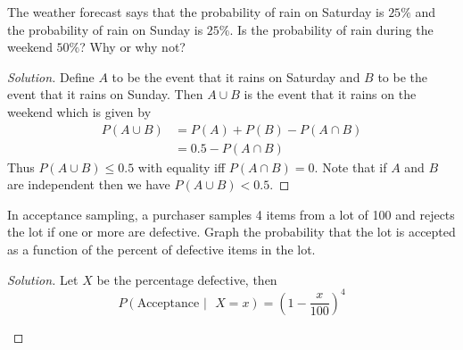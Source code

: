 \begin{exercise}{9} \label{1.9}
    The weather forecast says that the probability of rain on Saturday is \( 25\% \) and the probability of rain on Sunday is \( 25\% \). Is the probability of rain during the weekend \( 50\%\)? Why or why not?
    
    \begin{proof}[Solution]
        Define \( A \) to be the event that it rains on Saturday and \( B \) to be the event that it rains on Sunday. Then \( A \cup B \) is the event that it rains on the weekend which is given by 
        \begin{align*} 
            P(A \cup B) &= P(A) + P(B) - P(A \cap B) \\
            &= 0.5 - P(A \cap B)
        \end{align*}
        Thus \( P(A \cup B) \leq 0.5 \) with equality iff \( P(A \cap B) = 0 \). Note that if \( A \) and \( B \) are independent then we have \( P(A \cup B) < 0.5 \).
    \end{proof}
\end{exercise}

\begin{exercise}{17} \label{1.17}
    In acceptance sampling, a purchaser samples 4 items from a lot of 100 and rejects the lot if one or more are defective. Graph the probability that the lot is accepted as a function of the percent of defective items in the lot.
    
    \begin{proof}[Solution] Let \( X \) be the percentage defective, then
    \[ P(\text{Acceptance }\vert \text{ } X = x) = \left( 1-\frac{x}{100} \right)^4 \]
        \begin{center}
        \end{center}
    \end{proof}
\end{exercise}

